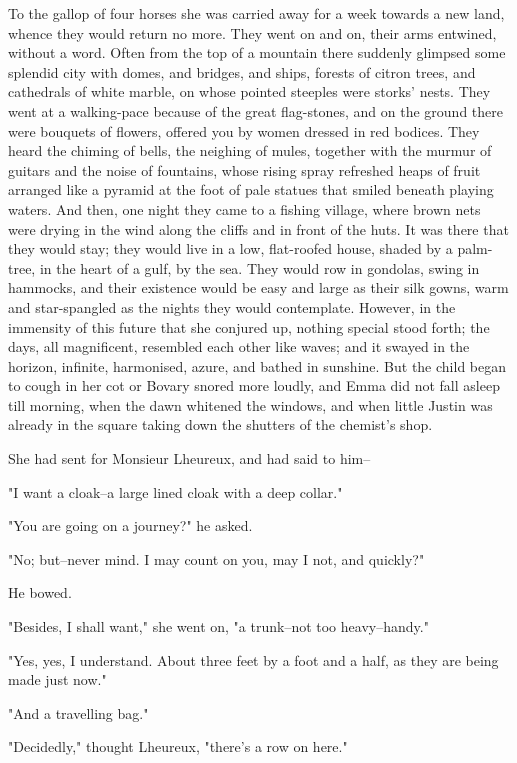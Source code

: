 \documentclass[11pt,twocolumn]{ltugboat}
\begin{document}
To the gallop of four horses she was carried away for a week towards a
new land, whence they would return no more. They went on and on, their
arms entwined, without a word. Often from the top of a mountain there
suddenly glimpsed some splendid city with domes, and bridges, and
ships, forests of citron trees, and cathedrals of white marble, on whose
pointed steeples were storks' nests. They went at a walking-pace because
of the great flag-stones, and on the ground there were bouquets of
flowers, offered you by women dressed in red bodices. They heard the
chiming of bells, the neighing of mules, together with the murmur of
guitars and the noise of fountains, whose rising spray refreshed heaps
of fruit arranged like a pyramid at the foot of pale statues that smiled
beneath playing waters. And then, one night they came to a fishing
village, where brown nets were drying in the wind along the cliffs and
in front of the huts. It was there that they would stay; they would live
in a low, flat-roofed house, shaded by a palm-tree, in the heart of a
gulf, by the sea. They would row in gondolas, swing in hammocks, and
their existence would be easy and large as their silk gowns, warm and
star-spangled as the nights they would contemplate. However, in the
immensity of this future that she conjured up, nothing special stood
forth; the days, all magnificent, resembled each other like waves; and
it swayed in the horizon, infinite, harmonised, azure, and bathed in
sunshine. But the child began to cough in her cot or Bovary snored
more loudly, and Emma did not fall asleep till morning, when the dawn
whitened the windows, and when little Justin was already in the square
taking down the shutters of the chemist's shop.

She had sent for Monsieur Lheureux, and had said to him--

"I want a cloak--a large lined cloak with a deep collar."

"You are going on a journey?" he asked.

"No; but--never mind. I may count on you, may I not, and quickly?"

He bowed.

"Besides, I shall want," she went on, "a trunk--not too heavy--handy."

"Yes, yes, I understand. About three feet by a foot and a half, as they
are being made just now."

"And a travelling bag."

"Decidedly," thought Lheureux, "there's a row on here."
\end{document}
